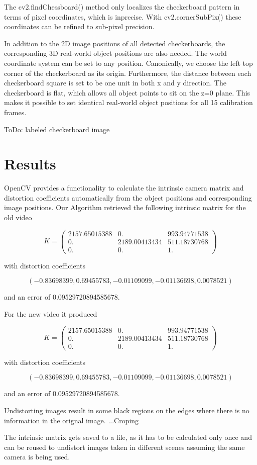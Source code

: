 \documentclass[bibliography=totoc]{scrartcl}
\begin{document}
The cv2.findChessboard() method only localizes the checkerboard pattern in terms of pixel coordinates, which is inprecise.
With cv2.cornerSubPix() these coordinates can be refined to sub-pixel precision.

In addition to the 2D image positions of all detected checkerboards, the corresponding 3D real-world object positions are also needed.
The world coordinate system can be set to any position. 
Canonically, we choose the left top corner of the checkerboard as its origin.
Furthermore, the distance between each checkerboard square is set to be one unit in both x and y direction. 
The checkerboard is flat, which allows all object points to sit on the z=0 plane.
This makes it possible to set identical real-world object positions for all 15 calibration frames.

ToDo: labeled checkerboard image


\section{Results}
OpenCV provides a functionality to calculate the intrinsic camera matrix and distortion coefficients automatically from the object positions and corresponding image positions.
Our Algorithm retrieved the following intrinsic matrix for the old video

$$
K =
\begin{pmatrix}
    2157.65015388 & 0. & 993.94771538 \\
    0. & 2189.00413434 & 511.18730768 \\
    0. & 0. & 1.
\end{pmatrix}
$$

with distortion coefficients

$$(-0.83698399, 0.69455783, -0.01109099, -0.01136698, 0.0078521)$$

and an error of 0.09529720894585678.

For the new video it produced 

$$
K =
\begin{pmatrix}
    2157.65015388 & 0. & 993.94771538 \\
    0. & 2189.00413434 & 511.18730768 \\
    0. & 0. & 1.
\end{pmatrix}
$$

with distortion coefficients

$$(-0.83698399, 0.69455783, -0.01109099, -0.01136698, 0.0078521)$$

and an error of 0.09529720894585678.


Undistorting images result in some black regions on the edges where there is no information in the orignal image.
...Croping

The intrinsic matrix gets saved to a file, as it has to be calculated only once and can be reused to undistort images taken in different scenes assuming the same camera is being used.

\clearpage


\end{document}
